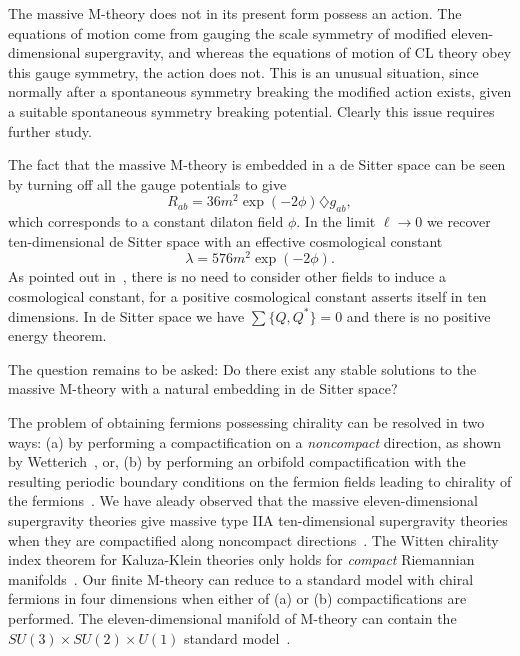 \documentclass[a4paper,12pt]{article}
\begin{document}
The massive M-theory does not in its present form possess an action. The
equations of motion come from gauging the scale symmetry of
modified eleven-dimensional supergravity, and whereas the equations of
motion of CL theory obey this gauge symmetry, the action does not.
This is an unusual situation, since normally after a spontaneous symmetry
breaking the modified action exists, given a suitable spontaneous symmetry
breaking potential. Clearly this issue requires further study.

The fact that the massive M-theory is embedded in a de Sitter
space can be seen by turning off all the gauge potentials to give
\begin{equation}
R_{ab}=36m^2\exp(-2\phi)\diamondsuit g_{ab},
\end{equation}
which corresponds to a constant dilaton field $\phi$. In the
limit $\ell\rightarrow 0$ we recover ten-dimensional de Sitter space with
an effective cosmological constant
\begin{equation}
\lambda=576m^2\exp(-2\phi).
\end{equation}
As pointed out
in~\cite{Lambert}, there is no need to consider other fields to induce a
cosmological constant, for a positive cosmological constant asserts itself
in ten dimensions. In de Sitter space we have $\sum\{Q,Q^*\}=0$ and there is
no positive energy theorem.

The question remains to be asked: Do there exist any stable solutions to
the massive M-theory with a natural embedding in de Sitter space?

The problem of obtaining fermions possessing chirality can be resolved in
two ways: (a) by performing a compactification on a {\it noncompact}
direction, as shown by Wetterich~\cite{Wetterich}, or, (b) by performing an
orbifold compactification with the resulting periodic boundary conditions
on the fermion fields leading to chirality of the fermions~\cite{Georgi}.
We have aleady observed that the massive eleven-dimensional supergravity
theories give massive type IIA ten-dimensional supergravity theories when
they are compactified along noncompact directions~\cite{Pope}. The Witten
chirality index theorem for Kaluza-Klein theories only holds for {\it
compact} Riemannian manifolds~\cite{Witten2}. Our finite M-theory can
reduce to a standard model with chiral fermions in four dimensions when
either of (a) or (b) compactifications are performed. The
eleven-dimensional manifold of M-theory can contain the $SU(3)\times
SU(2)\times U(1)$ standard model~\cite{Witten3}.
\end{document}
